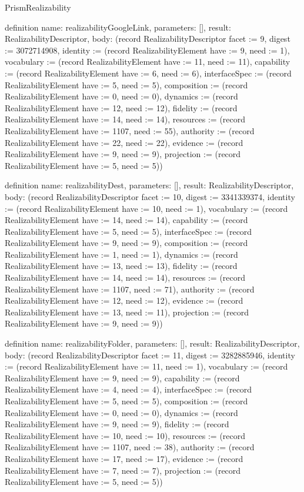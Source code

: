 \begin{lexlean}{PrismRealizability}
\begin{semanticmodule}
definition{
  name: realizabilityGoogleLink,
  parameters: [],
  result: RealizabilityDescriptor,
  body: (record RealizabilityDescriptor {facet := 9, digest := 3072714908, identity := (record RealizabilityElement {have := 9, need := 1}), vocabulary := (record RealizabilityElement {have := 11, need := 11}), capability := (record RealizabilityElement {have := 6, need := 6}), interfaceSpec := (record RealizabilityElement {have := 5, need := 5}), composition := (record RealizabilityElement {have := 0, need := 0}), dynamics := (record RealizabilityElement {have := 12, need := 12}), fidelity := (record RealizabilityElement {have := 14, need := 14}), resources := (record RealizabilityElement {have := 1107, need := 55}), authority := (record RealizabilityElement {have := 22, need := 22}), evidence := (record RealizabilityElement {have := 9, need := 9}), projection := (record RealizabilityElement {have := 5, need := 5})})
}

definition{
  name: realizabilityDest,
  parameters: [],
  result: RealizabilityDescriptor,
  body: (record RealizabilityDescriptor {facet := 10, digest := 3341339374, identity := (record RealizabilityElement {have := 10, need := 1}), vocabulary := (record RealizabilityElement {have := 14, need := 14}), capability := (record RealizabilityElement {have := 5, need := 5}), interfaceSpec := (record RealizabilityElement {have := 9, need := 9}), composition := (record RealizabilityElement {have := 1, need := 1}), dynamics := (record RealizabilityElement {have := 13, need := 13}), fidelity := (record RealizabilityElement {have := 14, need := 14}), resources := (record RealizabilityElement {have := 1107, need := 71}), authority := (record RealizabilityElement {have := 12, need := 12}), evidence := (record RealizabilityElement {have := 13, need := 11}), projection := (record RealizabilityElement {have := 9, need := 9})})
}

definition{
  name: realizabilityFolder,
  parameters: [],
  result: RealizabilityDescriptor,
  body: (record RealizabilityDescriptor {facet := 11, digest := 3282885946, identity := (record RealizabilityElement {have := 11, need := 1}), vocabulary := (record RealizabilityElement {have := 9, need := 9}), capability := (record RealizabilityElement {have := 4, need := 4}), interfaceSpec := (record RealizabilityElement {have := 5, need := 5}), composition := (record RealizabilityElement {have := 0, need := 0}), dynamics := (record RealizabilityElement {have := 9, need := 9}), fidelity := (record RealizabilityElement {have := 10, need := 10}), resources := (record RealizabilityElement {have := 1107, need := 38}), authority := (record RealizabilityElement {have := 17, need := 17}), evidence := (record RealizabilityElement {have := 7, need := 7}), projection := (record RealizabilityElement {have := 5, need := 5})})
}


\end{semanticmodule}
\end{lexlean}
